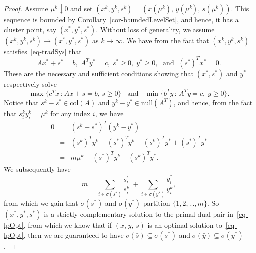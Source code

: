 \documentclass[10pt,a4paper]{amsart}
\def\sb{\bar{s}}
\def\xb{\bar{x}}
\def\yb{\bar{y}}
\begin{document}
\begin{proof}
Assume $\mu^k \downarrow 0$ and set 
$(x^k, y^k, s^k) = (x(\mu^k), \, y(\mu^k), \, s(\mu^k) )$.
This sequence is bounded by Corollary~\ref{cor-boundedLevelSet}, 
and hence, it has a cluster point, say $(x^*, y^*, s^*)$. Without loss 
of generality, we assume $(x^k, y^k, s^k) \rightarrow (x^*, y^*, s^*)$ 
as $k \rightarrow \infty$. We have from the fact that $(x^k, y^k, s^k)$ 
satisfies~\eqref{eq-tradSys} that
\[
Ax^* + s^* = b, \; A^T y^* = c, \; s^* \ge 0, \;  y^* \ge 0, \;
    \mbox{ and } \; (s^*)^T x^* = 0.
\]
These are the necessary and sufficient conditions showing 
that $(x^*, s^*)$ and $y^*$ respectively solve
\begin{equation} \label{eq-lpOpt}
\max \{ c^T x \, : \, Ax + s = b, \, s \ge 0 \}
\;\; \mbox{ and } \;\;
\min \{ b^T y \, : \, A^T y = c, \; y \ge 0 \}.
\end{equation}
Notice that $s^k - s^* \in \mbox{col}(A)$ and $y^k - y^* \in \mbox{null}(A^T)$,
and hence, from the fact that $s_i^k y_i^k = \mu^k$ for any index $i$, we have
\begin{eqnarray*}
0 & = & (s^k - s^*)^T (y^k - y^*) \\[4pt]
  & = & (s^k)^T y^k - (s^*)^T y^k - (s^k)^T y^* + (s^*)^T y^* \\[4pt]
  & = & m \mu^k - (s^*)^T y^k - (s^k)^T y^*.
\end{eqnarray*}
We subsequently have
\[
m = \sum_{i \in \sigma(s^*)} \frac{s^*_i}{s^k_i} 
    \; + \sum_{i \in \sigma(y^*)} \frac{y^*_i}{y^k_i},
\]
from which we gain that $\sigma(s^*)$ and $\sigma(y^*)$ partition
$\{1, 2, \ldots, m\}$. So $(x^*, y^*, s^*)$ is a strictly
complementary solution to the primal-dual pair in~\eqref{eq-lpOpt},
from which we know that if $(\xb, \, \yb, \, \sb)$ is an optimal 
solution to~\eqref{eq-lpOpt}, then we are guaranteed to have 
$\sigma(\sb) \subseteq \sigma(s^*)$ and
$\sigma(\yb) \subseteq \sigma(y^*)$.


\end{proof}
\end{document}
